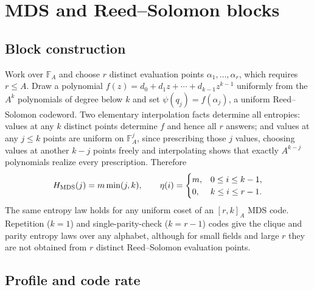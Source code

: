 \section{MDS and Reed--Solomon blocks}\label{app:mds}

\subsection{Block construction}

Work over $\mathbb F_{A}$ and choose $r$ distinct evaluation points
$\alpha_1,\ldots,\alpha_r$, which requires $r \le A$. Draw a
polynomial $f(z) = d_0 + d_1z + \cdots + d_{k-1}z^{k-1}$ uniformly
from the $A^k$ polynomials of degree below $k$ and set
$\psi(q_j) = f(\alpha_j)$, a uniform Reed--Solomon codeword. Two
elementary interpolation facts determine all entropies: values at any
$k$ distinct points determine $f$ and hence all $r$ answers; and
values at any $j\le k$ points are uniform on $\mathbb F_{A}^j$, since
prescribing those $j$ values, choosing values at another $k-j$ points
freely and interpolating shows that exactly $A^{k-j}$ polynomials
realize every prescription. Therefore
%
\begin{equation}
  H_{\rm MDS}(j) = m\min(j,k),
  \qquad
  \eta(i) =
  \begin{cases}
    m, & 0\le i\le k-1,\\
    0, & k\le i\le r-1 .
  \end{cases}
  \label{eq:appmdseta}
\end{equation}
%
The same entropy law holds for any uniform coset of an $[r,k]_{A}$
MDS code. Repetition ($k = 1$) and single-parity-check ($k = r-1$)
codes give the clique and parity entropy laws over any alphabet,
although for small fields and large $r$ they are not obtained from
$r$ distinct Reed--Solomon evaluation points.

\subsection{Profile and code rate}

